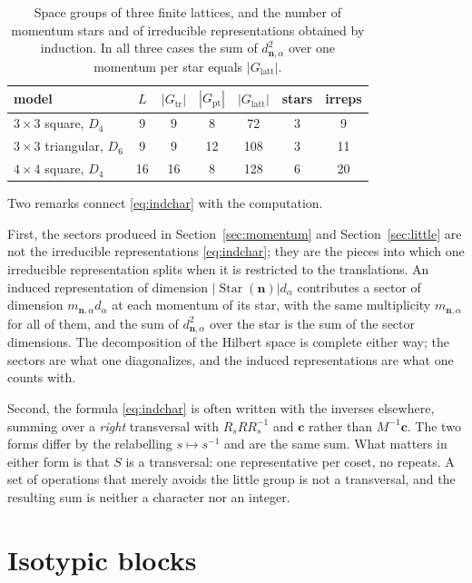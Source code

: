 \documentclass[12pt]{article}
\newcommand{\Glatt}{G_{\mathrm{latt}}}
\newcommand{\Gtr}{G_{\mathrm{tr}}}
\newcommand{\Gpt}{G_{\mathrm{pt}}}
\newcommand{\Star}{\operatorname{Star}}
\begin{document}
\begin{table}[t]
\centering
\begin{tabular}{lcccccc}
\toprule
model & $L$ & $|\Gtr|$ & $|\Gpt|$ & $|\Glatt|$ & stars & irreps \\
\midrule
$3\times3$ square, $D_4$ & 9 & 9 & 8 & 72 & 3 & 9 \\
$3\times3$ triangular, $D_6$ & 9 & 9 & 12 & 108 & 3 & 11 \\
$4\times4$ square, $D_4$ & 16 & 16 & 8 & 128 & 6 & 20 \\
\bottomrule
\end{tabular}
\caption{Space groups of three finite lattices, and the number of momentum stars
and of irreducible representations obtained by induction. In all three cases the
sum of $d_{\mathbf{n},\alpha}^2$ over one momentum per star equals $|\Glatt|$.}
\label{tab:groups}
\end{table}

Two remarks connect \eqref{eq:indchar} with the computation.

First, the sectors produced in Section~\ref{sec:momentum} and
Section~\ref{sec:little} are not the irreducible representations
\eqref{eq:indchar}; they are the pieces into which one irreducible
representation splits when it is restricted to the translations. An induced
representation of dimension $|\Star(\mathbf{n})|d_\alpha$ contributes a sector
of dimension $m_{\mathbf{n},\alpha}d_\alpha$ at each momentum of its star, with
the same multiplicity $m_{\mathbf{n},\alpha}$ for all of them, and the sum of
$d_{\mathbf{n},\alpha}^2$ over the star is the sum of the sector dimensions.
The decomposition of the Hilbert space is complete either way; the sectors are
what one diagonalizes, and the induced representations are what one counts
with.

Second, the formula \eqref{eq:indchar} is often written with the inverses
elsewhere, summing over a \emph{right} transversal with $R_s R R_s^{-1}$ and
$\mathbf{c}$ rather than $M^{-1}\mathbf{c}$. The two forms differ by the
relabelling $s\mapsto s^{-1}$ and are the same sum. What matters in either form
is that $S$ is a transversal: one representative per coset, no repeats. A set of
operations that merely avoids the little group is not a transversal, and the
resulting sum is neither a character nor an integer.

\section{Isotypic blocks}\label{sec:blocks}
\end{document}
